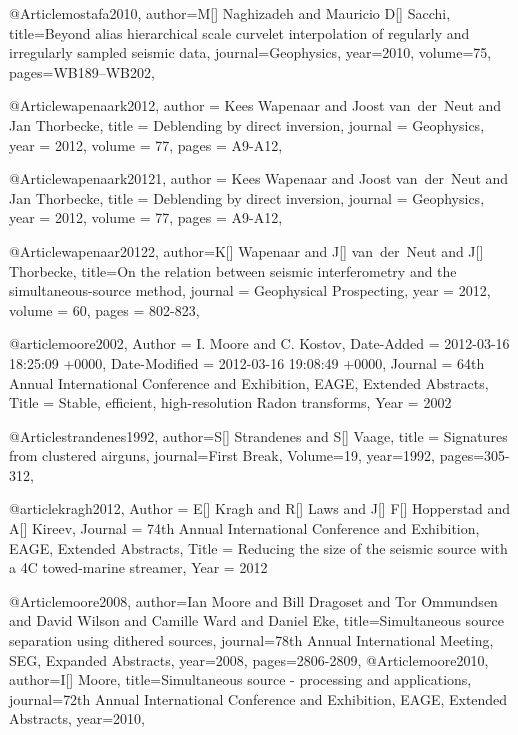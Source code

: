 @Article{mostafa2010,
  author={M[] Naghizadeh and Mauricio D[] Sacchi},
  title={Beyond alias hierarchical scale curvelet interpolation of regularly and irregularly sampled seismic data},
  journal={Geophysics},
  year=2010,
  volume=75,
  pages={WB189–WB202},
}

@Article{wapenaark2012,
  author = 	 {Kees Wapenaar and Joost van~der~Neut and Jan Thorbecke},
  title = 	 {Deblending by direct inversion},
  journal = 	 {Geophysics},
  year = 	 2012,
  volume =	 77,
  pages =	 {A9-A12},
}

@Article{wapenaark20121,
  author = 	 {Kees Wapenaar and Joost van~der~Neut and Jan Thorbecke},
  title = 	 {Deblending by direct inversion},
  journal = 	 {Geophysics},
  year = 	 2012,
  volume =	 77,
  pages =	 {A9-A12},
}


@Article{wapenaar20122,
  author={K[] Wapenaar and J[] van~der~Neut and J[] Thorbecke},
  title={On the relation between seismic interferometry and the simultaneous-source method},
  journal = 	 {Geophysical Prospecting},
  year = 	 2012,
  volume =	 60,
  pages =	 {802-823},
}

@article{moore2002,
	Author = {I. Moore and C. Kostov},
	Date-Added = {2012-03-16 18:25:09 +0000},
	Date-Modified = {2012-03-16 19:08:49 +0000},
	Journal = {64th Annual International Conference and Exhibition, EAGE, Extended Abstracts},
	Title = {Stable, efficient, high-resolution {R}adon transforms},
	Year = {2002}}

@Article{strandenes1992,
  author={S[] Strandenes and S[] Vaage},
  title = {Signatures from clustered airguns},
  journal={First Break},
  Volume=19,
  year=1992,
  pages={305-312},
}

@article{kragh2012,
	Author = {E[] Kragh and R[] Laws and J[] F[] Hopperstad and A[] Kireev},
	Journal = {74th Annual International Conference and Exhibition, EAGE, Extended Abstracts},
	Title = {Reducing the size of the seismic source with a 4C towed-marine streamer},
	Year = {2012}}


@Article{moore2008,
  author={Ian Moore and Bill Dragoset and Tor Ommundsen and David Wilson and Camille Ward and Daniel Eke},
  title={Simultaneous source separation using dithered sources},
  journal={78th Annual International Meeting, SEG, Expanded Abstracts},
  year=2008,
  pages={2806-2809},
}
@Article{moore2010,
  author={I[] Moore},
  title={Simultaneous source - processing and applications},
  journal={72th Annual International Conference and Exhibition, EAGE, Extended Abstracts},
  year=2010,
}


